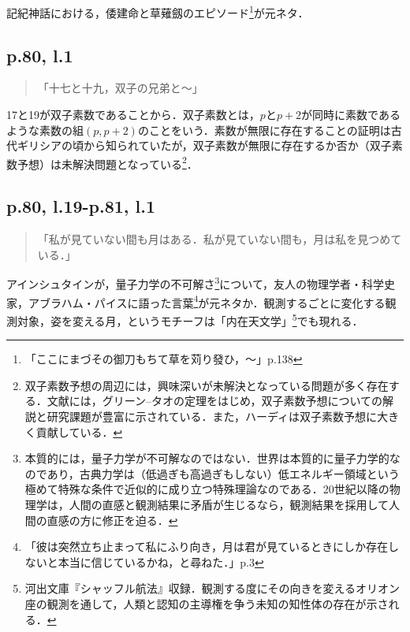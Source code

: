 \documentclass[10pt, a5paper, twoside]{jsarticle}
\theoremstyle{definition}
\begin{document}
			記紀神話における，倭建命と草薙劔のエピソード\footnote{「ここにまづその御刀もちて草を苅り發ひ，〜」\cite{fkf}p.138}が元ネタ．

		\subsection{p.80, l.1}

			\begin{quote}

				「十七と十九，双子の兄弟と〜」
				
			\end{quote}

			17と19が双子素数であることから．双子素数とは，$p$と$p+2$が同時に素数であるような素数の組$(p, p+2)$のことをいう．素数が無限に存在することの証明は古代ギリシアの頃から知られていたが，双子素数が無限に存在するか否か（双子素数予想）は未解決問題となっている\footnote{双子素数予想の周辺には，興味深いが未解決となっている問題が多く存在する．文献\cite{seisu}には，グリーン--タオの定理をはじめ，双子素数予想についての解説と研究課題が豊富に示されている．また，ハーディは双子素数予想に大きく貢献している．}．

		\subsection{p.80, l.19-p.81, l.1}

			\begin{quote}

				「私が見ていない間も月はある．私が見ていない間も，月は私を見つめている．」
				
			\end{quote}

			アインシュタインが，量子力学の不可解さ\footnote{本質的には，量子力学が不可解なのではない．世界は本質的に量子力学的なのであり，古典力学は（低過ぎも高過ぎもしない）低エネルギー領域という極めて特殊な条件で近似的に成り立つ特殊理論なのである．20世紀以降の物理学は，人間の直感と観測結果に矛盾が生じるなら，観測結果を採用して人間の直感の方に修正を迫る．}について，友人の物理学者・科学史家，アブラハム・パイスに語った言葉\footnote{「彼は突然立ち止まって私にふり向き，月は君が見ているときにしか存在しないと本当に信じているかね，と尋ねた．」\cite{pais}p.3}が元ネタか．観測するごとに変化する観測対象，姿を変える月，というモチーフは「内在天文学」\footnote{河出文庫『シャッフル航法』収録．観測する度にその向きを変えるオリオン座の観測を通して，人類と認知の主導権を争う未知の知性体の存在が示される．}でも現れる．
\end{document}
